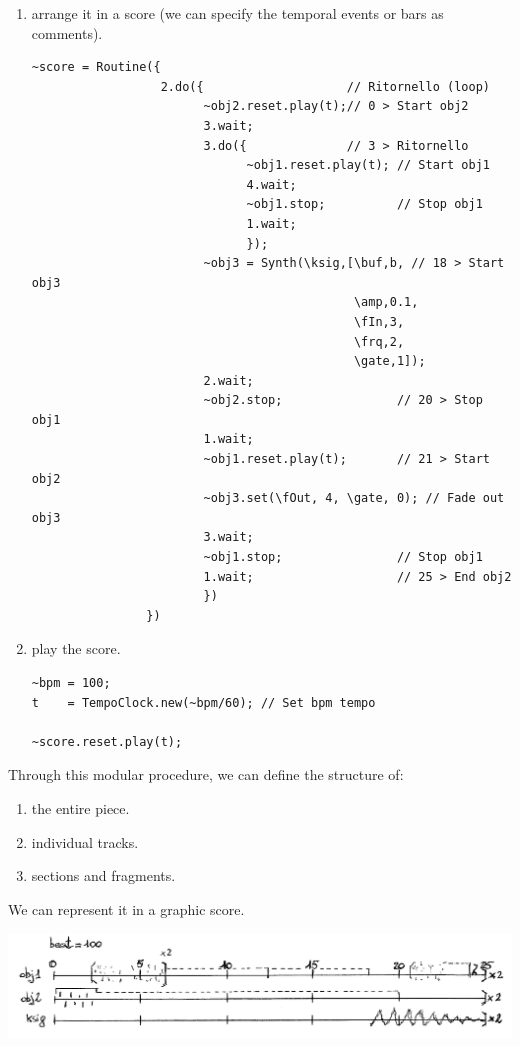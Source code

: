 \begin{enumerate}
\item arrange it in a score (we can specify the temporal events or bars as comments).
\begin{lstlisting}[frame=single] 
~score = Routine({
                  2.do({                    // Ritornello (loop)
                        ~obj2.reset.play(t);// 0 > Start obj2
                        3.wait;
                        3.do({              // 3 > Ritornello 
                              ~obj1.reset.play(t); // Start obj1
                              4.wait;
                              ~obj1.stop;          // Stop obj1
                              1.wait;
                              });
                        ~obj3 = Synth(\ksig,[\buf,b, // 18 > Start obj3
                                             \amp,0.1,
                                             \fIn,3,
                                             \frq,2,
                                             \gate,1]); 
                        2.wait;
                        ~obj2.stop;                // 20 > Stop obj1
                        1.wait;
                        ~obj1.reset.play(t);       // 21 > Start obj2
                        ~obj3.set(\fOut, 4, \gate, 0); // Fade out obj3
                        3.wait;
                        ~obj1.stop;                // Stop obj1
                        1.wait;                    // 25 > End obj2                                        
                        })
                })
\end{lstlisting}

\item play the score.
\begin{lstlisting}[frame=single] 
~bpm = 100;                         
t    = TempoClock.new(~bpm/60); // Set bpm tempo

~score.reset.play(t);
\end{lstlisting}
\end{enumerate}

Through this modular procedure, we can define the structure of: 
    
\begin{enumerate}
\tightlist
\item the entire piece. 
\item individual tracks. 
\item sections and fragments.
\end{enumerate} 

We can represent it in a graphic score.

\begin{center}
\includegraphics[scale=1]{../img/scores.png}
\end{center}

